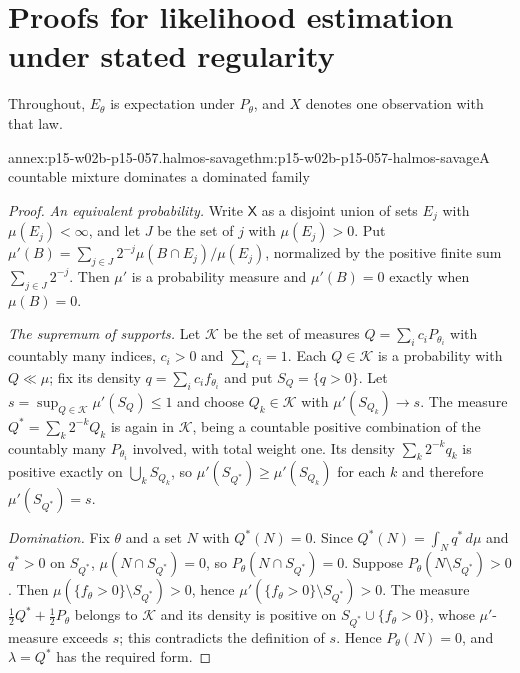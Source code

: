 \section{Proofs for likelihood estimation under stated regularity}
\label{sec:p15-w02b-p15-057-annex}

Throughout, \(E_\theta\) is expectation under \(P_\theta\), and
\(X\) denotes one observation with that law.

\begin{annexitem}{annex:p15-w02b-p15-057.halmos-savage}{thm:p15-w02b-p15-057-halmos-savage}{A countable mixture dominates a dominated family}
\begin{proof}
\emph{An equivalent probability.} Write \(\mathsf X\) as a disjoint union
of sets \(E_j\) with \(\mu(E_j)<\infty\), and let \(J\) be the set of
\(j\) with \(\mu(E_j)>0\). Put
\(\mu'(B)=\sum_{j\in J}2^{-j}\mu(B\cap E_j)/\mu(E_j)\), normalized by the
positive finite sum \(\sum_{j\in J}2^{-j}\). Then \(\mu'\) is a probability
measure and \(\mu'(B)=0\) exactly when \(\mu(B)=0\).

\emph{The supremum of supports.} Let \(\mathcal K\) be the set of
measures \(Q=\sum_ic_iP_{\theta_i}\) with countably many indices,
\(c_i>0\) and \(\sum_ic_i=1\). Each \(Q\in\mathcal K\) is a probability
with \(Q\ll\mu\); fix its density \(q=\sum_ic_if_{\theta_i}\) and put
\(S_Q=\{q>0\}\). Let \(s=\sup_{Q\in\mathcal K}\mu'(S_Q)\leq1\) and choose
\(Q_k\in\mathcal K\) with \(\mu'(S_{Q_k})\to s\). The measure
\(Q^*=\sum_k2^{-k}Q_k\) is again in \(\mathcal K\), being a countable
positive combination of the countably many \(P_{\theta_i}\) involved, with
total weight one. Its density \(\sum_k2^{-k}q_k\) is positive exactly on
\(\bigcup_kS_{Q_k}\), so \(\mu'(S_{Q^*})\geq\mu'(S_{Q_k})\) for each
\(k\) and therefore \(\mu'(S_{Q^*})=s\).

\emph{Domination.} Fix \(\theta\) and a set \(N\) with \(Q^*(N)=0\).
Since \(Q^*(N)=\int_Nq^*\,d\mu\) and \(q^*>0\) on \(S_{Q^*}\),
\(\mu(N\cap S_{Q^*})=0\), so \(P_\theta(N\cap S_{Q^*})=0\). Suppose
\(P_\theta(N\setminus S_{Q^*})>0\). Then
\(\mu(\{f_\theta>0\}\setminus S_{Q^*})>0\), hence
\(\mu'(\{f_\theta>0\}\setminus S_{Q^*})>0\). The measure
\(\tfrac12Q^*+\tfrac12P_\theta\) belongs to \(\mathcal K\) and its
density is positive on \(S_{Q^*}\cup\{f_\theta>0\}\), whose
\(\mu'\)-measure exceeds \(s\); this contradicts the definition of
\(s\). Hence \(P_\theta(N)=0\), and \(\lambda=Q^*\) has the required form.
\end{proof}
\end{annexitem}

